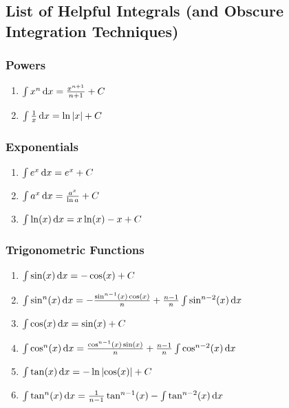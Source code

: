\documentclass{article}
\begin{document}
  \subsection{List of Helpful Integrals (and Obscure Integration Techniques)}
  {
    \everymath{\displaystyle}
    \subsubsection*{Powers}
    \begin{enumerate}
      \item \(\int x^n \, \mathrm{d} x = \frac{x^{n+1}}{n+1} + C\)
      \item \(\int \frac{1}{x} \, \mathrm{d} x = \ln\left\lvert x\right\rvert + C\)
    \end{enumerate}

    \subsubsection*{Exponentials}
    \begin{enumerate}
      \item \(\int e^x \, \mathrm{d} x = e^x + C\)
      \item \(\int a^x \, \mathrm{d} x = \frac{a^x}{\ln a} + C\)
      \item \(\int \ln(x) \, \mathrm{d} x = x \ln(x) - x + C\)
    \end{enumerate}

    \subsubsection*{Trigonometric Functions}
    \begin{enumerate}
      \item \(\int \sin(x) \, \mathrm{d} x = -\cos(x) + C\)
      
      \item \(\int \sin^n(x) \, \mathrm{d} x = -\frac{\sin^{n-1}(x) \cos(x)}{n} + \frac{n-1}{n} \int \sin^{n-2}(x) \, \mathrm{d} x\)
      
      \item \(\int \cos(x) \, \mathrm{d} x = \sin(x) + C\)
      
      \item \(\int \cos^n(x) \, \mathrm{d} x = \frac{\cos^{n-1}(x) \sin(x)}{n} + \frac{n-1}{n} \int \cos^{n-2}(x) \, \mathrm{d} x\)
      
      \item \(\int \tan(x) \, \mathrm{d} x = -\ln\left\lvert \cos(x)\right\rvert + C\)
      
      \item \(\int \tan^n(x) \, \mathrm{d} x = \frac{1}{n-1} \tan^{n-1}(x) - \int \tan^{n-2}(x) \, \mathrm{d} x\)
      

\end{enumerate}}
\end{document}
